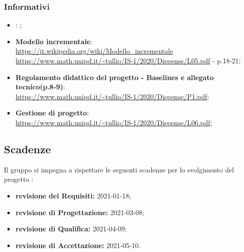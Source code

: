 \subsubsection{Informativi}
\begin{itemize}
\item \textbf{\AdR{}}: ;
\item \textbf{Modello incrementale}:\\ \url{https://it.wikipedia.org/wiki/Modello_incrementale} \\ \url{https://www.math.unipd.it/~tullio/IS-1/2020/Dispense/L05.pdf} - p.18-21;
\item \textbf{Regolamento didattico del progetto - Baselines e allegato tecnico(p.8-9)}:\\ \url{https://www.math.unipd.it/~tullio/IS-1/2020/Dispense/P1.pdf};
\item \textbf{Gestione di progetto}:\\ \url{https://www.math.unipd.it/~tullio/IS-1/2020/Dispense/L06.pdf};

\end{itemize}

\subsection{Scadenze}
Il gruppo \Omicron{} si impegna a rispettare le seguenti scadenze per lo svolgimento del progetto \nameproject{}:
\begin{itemize}
\item \textbf{revisione dei Requisiti:} 2021-01-18;
\item \textbf{revisione di Progettazione:} 2021-03-08;
\item \textbf{revisione di Qualifica:} 2021-04-09;
\item \textbf{revisione di Accettazione:} 2021-05-10.
\end{itemize}